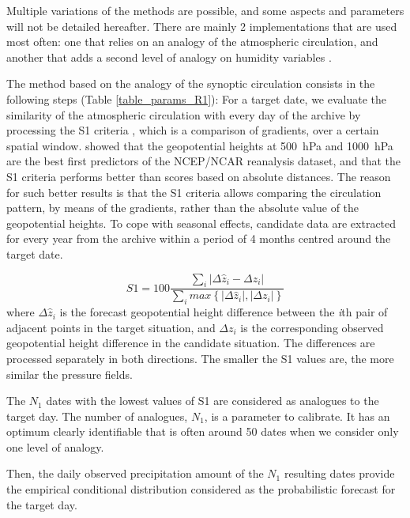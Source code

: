 \documentclass{ametsoc}
\begin{document}
Multiple variations of the methods are possible, and some aspects and parameters will not be detailed hereafter. There are mainly 2 implementations that are used most often: one that relies on an analogy of the atmospheric circulation, and another that adds a second level of analogy on humidity variables \citep{Obled2002, Bontron2005, Marty2012}.

The method based on the analogy of the synoptic circulation consists in the following steps (Table \ref{table_params_R1}): For a target date, we evaluate the similarity of the atmospheric circulation with every day of the archive by processing the S1 criteria \citep[Eq.\ (\ref{eq:S1}), ][]{Teweles1954, Drosdowsky2003}, which is a comparison of gradients, over a certain spatial window. \citet{Bontron2005} showed that the geopotential heights at 500~hPa and 1000~hPa are the best first predictors of the NCEP/NCAR reanalysis dataset, and that the S1 criteria performs better than scores based on absolute distances. The reason for such better results is that the S1 criteria allows comparing the circulation pattern, by means of the gradients, rather than the absolute value of the geopotential heights. To cope with seasonal effects, candidate data are extracted for every year from the archive within a period of 4 months centred around the target date.

\begin{equation}
\label{eq:S1}
S1=100 \frac {\displaystyle \sum_{i} \vert \Delta\hat{z}_{i} - \Delta z_{i} \vert}
{\displaystyle \sum_{i} max\left\lbrace \vert \Delta\hat{z}_{i} \vert , \vert \Delta z_{i} \vert \right\rbrace }
\end{equation}
where $\Delta \hat{z}_{i}$ is the forecast geopotential height difference between the \textit{i}th pair of adjacent points in the target situation, and $\Delta z_{i}$ is the corresponding observed geopotential height difference in the candidate situation. The differences are processed separately in both directions. The smaller the S1 values are, the more similar the pressure fields.

The $N_{1}$ dates with the lowest values of S1 are considered as analogues to the target day. The number of analogues, $N_{1}$, is a parameter to calibrate. It has an optimum clearly identifiable that is often around 50 dates when we consider only one level of analogy.

Then, the daily observed precipitation amount of the $N_{1}$ resulting dates provide the empirical conditional distribution considered as the probabilistic forecast for the target day.
\end{document}
